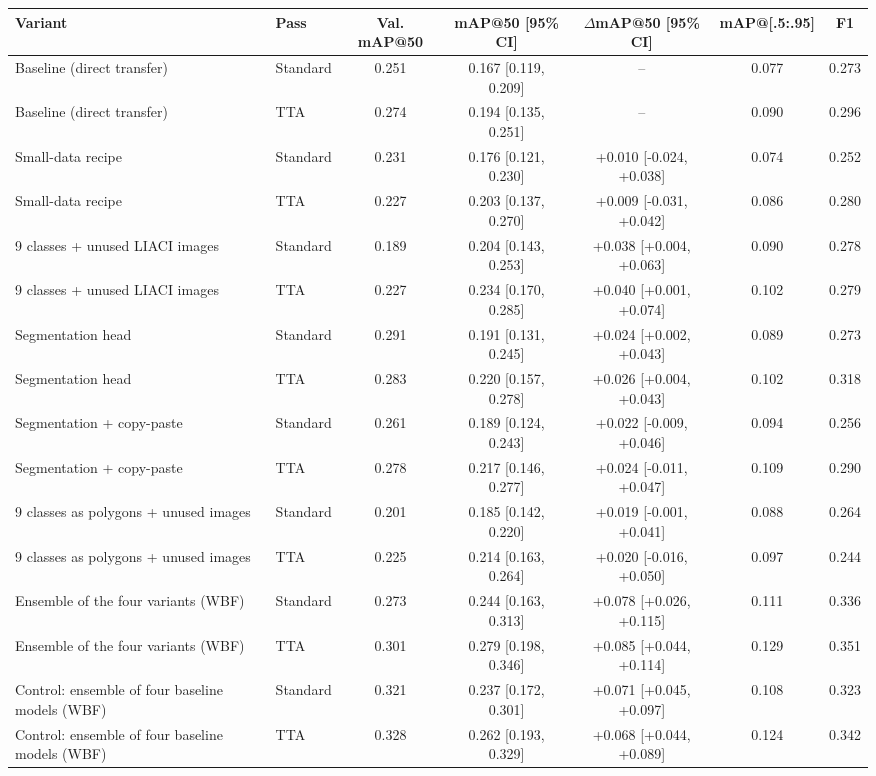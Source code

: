 \begin{tabular}{llccccc}
\toprule
Variant & Pass & Val. mAP@50 & mAP@50 [95\% CI] & $\Delta$mAP@50 [95\% CI] & mAP@[.5:.95] & F1 \\
\midrule
Baseline (direct transfer) & Standard & 0.251 & 0.167 [0.119, 0.209] & -- & 0.077 & 0.273 \\
Baseline (direct transfer) & TTA & 0.274 & 0.194 [0.135, 0.251] & -- & 0.090 & 0.296 \\
Small-data recipe & Standard & 0.231 & 0.176 [0.121, 0.230] & +0.010 [-0.024, +0.038] & 0.074 & 0.252 \\
Small-data recipe & TTA & 0.227 & 0.203 [0.137, 0.270] & +0.009 [-0.031, +0.042] & 0.086 & 0.280 \\
9 classes + unused LIACI images & Standard & 0.189 & 0.204 [0.143, 0.253] & +0.038 [+0.004, +0.063] & 0.090 & 0.278 \\
9 classes + unused LIACI images & TTA & 0.227 & 0.234 [0.170, 0.285] & +0.040 [+0.001, +0.074] & 0.102 & 0.279 \\
Segmentation head & Standard & 0.291 & 0.191 [0.131, 0.245] & +0.024 [+0.002, +0.043] & 0.089 & 0.273 \\
Segmentation head & TTA & 0.283 & 0.220 [0.157, 0.278] & +0.026 [+0.004, +0.043] & 0.102 & 0.318 \\
Segmentation + copy-paste & Standard & 0.261 & 0.189 [0.124, 0.243] & +0.022 [-0.009, +0.046] & 0.094 & 0.256 \\
Segmentation + copy-paste & TTA & 0.278 & 0.217 [0.146, 0.277] & +0.024 [-0.011, +0.047] & 0.109 & 0.290 \\
9 classes as polygons + unused images & Standard & 0.201 & 0.185 [0.142, 0.220] & +0.019 [-0.001, +0.041] & 0.088 & 0.264 \\
9 classes as polygons + unused images & TTA & 0.225 & 0.214 [0.163, 0.264] & +0.020 [-0.016, +0.050] & 0.097 & 0.244 \\
Ensemble of the four variants (WBF) & Standard & 0.273 & 0.244 [0.163, 0.313] & +0.078 [+0.026, +0.115] & 0.111 & 0.336 \\
Ensemble of the four variants (WBF) & TTA & 0.301 & 0.279 [0.198, 0.346] & +0.085 [+0.044, +0.114] & 0.129 & 0.351 \\
Control: ensemble of four baseline models (WBF) & Standard & 0.321 & 0.237 [0.172, 0.301] & +0.071 [+0.045, +0.097] & 0.108 & 0.323 \\
Control: ensemble of four baseline models (WBF) & TTA & 0.328 & 0.262 [0.193, 0.329] & +0.068 [+0.044, +0.089] & 0.124 & 0.342 \\
\bottomrule
\end{tabular}
